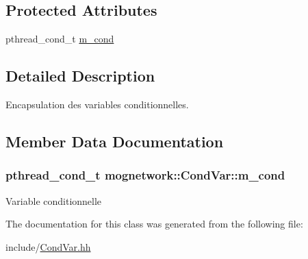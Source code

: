 \subsection*{Protected Attributes}
\begin{DoxyCompactItemize}
\item 
pthread\-\_\-cond\-\_\-t \hyperlink{classmognetwork_1_1_cond_var_adc18d17b3c2e11768b1103b499f49c97}{m\-\_\-cond}
\end{DoxyCompactItemize}


\subsection{Detailed Description}
Encapsulation des variables conditionnelles. 

\subsection{Member Data Documentation}
\hypertarget{classmognetwork_1_1_cond_var_adc18d17b3c2e11768b1103b499f49c97}{
\subsubsection[{m\-\_\-cond}]{\setlength{\rightskip}{0pt plus 5cm}pthread\-\_\-cond\-\_\-t mognetwork\-::\-Cond\-Var\-::m\-\_\-cond\hspace{0.3cm}{\ttfamily [protected]}}}\label{classmognetwork_1_1_cond_var_adc18d17b3c2e11768b1103b499f49c97}
Variable conditionnelle 

The documentation for this class was generated from the following file\-:\begin{DoxyCompactItemize}
\item 
include/\hyperlink{_cond_var_8hh}{Cond\-Var.\-hh}\end{DoxyCompactItemize}
